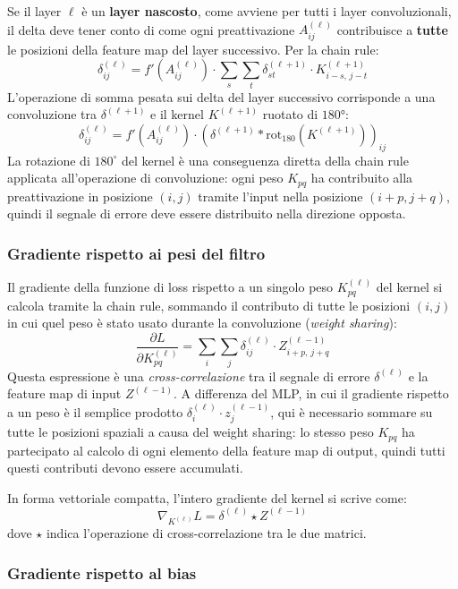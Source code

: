 Se il layer $\ell$ è un \textbf{layer nascosto}, come avviene per tutti i layer convoluzionali, il delta deve tener conto di come ogni preattivazione $A^{(\ell)}_{ij}$ contribuisce a \textbf{tutte} le posizioni della feature map del layer successivo. Per la chain rule:
\[
\delta^{(\ell)}_{ij}=f'\!\left(A^{(\ell)}_{ij}\right) \cdot\sum_{s}\sum_{t}\delta^{(\ell+1)}_{st}\cdot K^{(\ell+1)}_{i-s,\,j-t}
\]
L'operazione di somma pesata sui delta del layer successivo corrisponde a una convoluzione tra $\delta^{(\ell+1)}$ e il kernel $K^{(\ell+1)}$ ruotato di $180°$:
\[
\delta^{(\ell)}_{ij} = f'\!\left(A^{(\ell)}_{ij}\right) \cdot\left(\delta^{(\ell+1)}*\mathrm{rot}_{180}\!\left(K^{(\ell+1)}\right)\right)_{ij}
\]
La rotazione di $180^{\circ}$ del kernel è una conseguenza diretta della chain rule applicata all'operazione di convoluzione: ogni peso $K_{pq}$ ha contribuito alla preattivazione in posizione $(i,j)$ tramite l'input nella posizione $(i+p, j+q)$, quindi il segnale di errore deve essere distribuito nella direzione opposta.

\subsubsection{Gradiente rispetto ai pesi del filtro}

Il gradiente della funzione di loss rispetto a un singolo peso $K^{(\ell)}_{pq}$ del kernel si calcola tramite la chain rule, sommando il contributo di tutte le posizioni $(i,j)$ in cui quel peso è stato usato durante la convoluzione (\textit{weight sharing}):
\[
\frac{\partial L}{\partial K^{(\ell)}_{pq}}= \sum_{i}\sum_{j}\delta^{(\ell)}_{ij}\cdot Z^{(\ell-1)}_{i+p,\,j+q}
\]
Questa espressione è una \emph{cross-correlazione} tra il segnale di errore $\delta^{(\ell)}$ e la feature map di input $Z^{(\ell-1)}$. A differenza del MLP, in cui il gradiente rispetto a un peso è il semplice prodotto $\delta_i^{(\ell)} \cdot z_j^{(\ell-1)}$, qui è necessario sommare su tutte le posizioni spaziali a causa del weight sharing: lo stesso peso $K_{pq}$ ha partecipato al calcolo di ogni elemento della feature map di output, quindi tutti questi contributi devono essere accumulati.

In forma vettoriale compatta, l'intero gradiente del kernel si scrive come:
\[
\nabla_{K^{(\ell)}}L=\delta^{(\ell)}\star Z^{(\ell-1)}
\]
dove $\star$ indica l'operazione di cross-correlazione tra le due matrici.

\subsubsection{Gradiente rispetto al bias}

